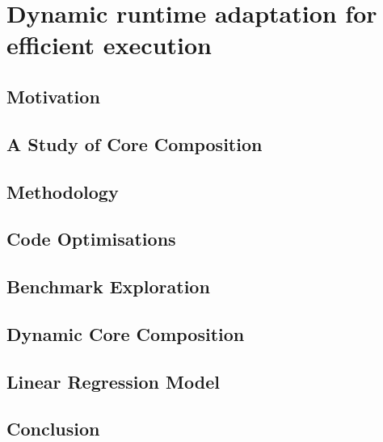 \newcommand{\bm}[1]{\textit{#1}}
\setlength{\textfloatsep}{0.1cm}

\chapter{Dynamic runtime adaptation for efficient execution}\label{chp:cases}




%

\section{Motivation}\label{sec:motivation}


\section{A Study of Core Composition}\label{sec:lim_study}


\section{Methodology}\label{sec:setup}


\section{Code Optimisations}\label{sec:opt}


\section{Benchmark Exploration}\label{sec:expl}


\section{Dynamic Core Composition}\label{sec:dynamic}


\vspace{-1em}
\section{Linear Regression Model}\label{sec:model}


%

\section{Conclusion}\label{sec:conc}

